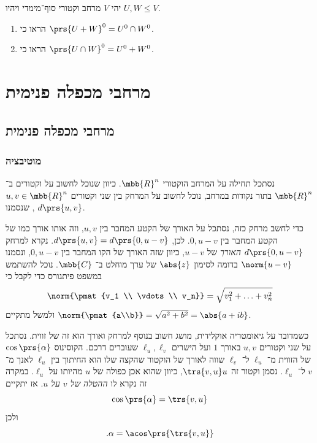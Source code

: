 \documentclass[a4paper,10pt,twoside,openany]{book}
\begin{document}
\begin{exercisechap}
יהי
$V$
מרחב וקטורי סוף־מימדי ויהיו
$U,W \leq V$.
\begin{enumerate}
\item הראו כי
$\prs{U+W}^0 = U^0 \cap W^0$.
\item הראו כי
$\prs{U \cap W}^0 = U^0 + W^0$.
\end{enumerate}
\end{exercisechap}

\part{מרחבי מכפלה פנימית}

\chapter{מרחבי מכפלה פנימית}

\section{מוטיבציה}

נסתכל תחילה על המרחב הוקטורי
$\mbb{R}^n$.
כיוון שנוכל לחשוב על וקטורים ב־%
$\mbb{R}^n$
בתור נקודות במרחב, נוכל לחשוב על המרחק בין שני וקטורים
$u,v \in \mbb{R}^n$,
שנסמנו
$d\prs{u,v}$.

כדי לחשב מרחק כזה, נסתכל על האורך של הקטע המחבר בין
$u,v$,
וזה אותו אורך כמו של הקטע המחבר בין
$0,u-v$.
לכן,
$d\prs{u,v} = d\prs{0,u-v}$.
נקרא למרחק
$d\prs{0,u-v}$
\emph{האורך}
של
$u-v$,
כיוון שזה האורך של הקו המחבר בין
$0,u-v$,
ונסמנו
$\norm{u-v}$
בדומה לסימון
$\abs{z}$
של ערך מוחלט ב־%
$\mbb{C}$.
נוכל להשתמש במשפט פיתגורס כדי לקבל כי
\[\norm{\pmat{v_1 \\ \vdots \\ v_n}} = \sqrt{v_1^2 + \ldots + v_n^2}\]
ולמשל מתקיים
$\norm{\pmat{a\\b}} = \sqrt{a^2 + b^2} = \abs{a + ib}$.

כשמדובר על גיאומטריה אוקלידית, מושג חשוב בנוסף למרחק ואורך הוא זה של זווית. נסתכל על שני וקטורים
$u,v$
באורך
$1$
ועל הישרים
$\ell_u, \ell_v$
שעוברים דרכם.
הקוסינוס
$\cos\prs{\alpha}$
של הזווית מ־%
$\ell_u$
ל־%
$\ell_v$
שווה לאורך של הוקטור שהקצה שלו הוא החיתוך בין
$\ell_u$
לאנך מ־%
$v$
ל־%
$\ell_u$.
נסמן וקטור זה
$\trs{v,u} u$,
כיוון שהוא אכן כפולה של
$u$
מהיותו על
$\ell_u$.
במקרה זה נקרא לו
\emph{ההטלה של
$v$
על
$u$}.
אז יתקיים
\[\cos\prs{\alpha} = \trs{v,u}\]
ולכן
\[\text{.} \alpha = \acos\prs{\trs{v,u}}\]
\end{document}
